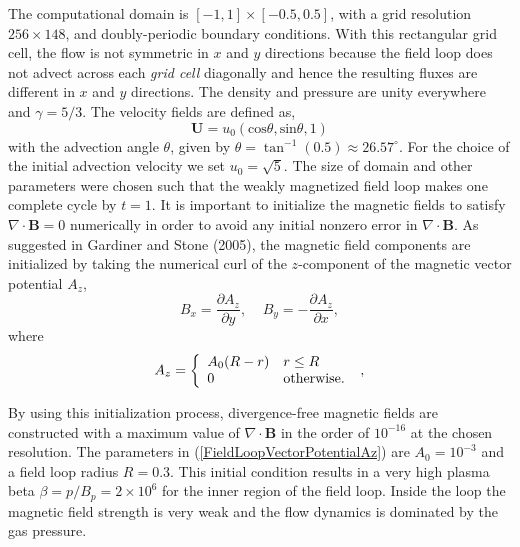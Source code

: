 The computational domain is $[-1,1]\times[-0.5,0.5]$, with a grid resolution $256\times148$, and doubly-periodic boundary conditions. 
With this rectangular grid cell, the flow is not symmetric in $x$ and $y$ directions because the field loop does not advect across each {\em grid cell} diagonally and hence the resulting fluxes are different in $x$ and $y$ directions. 
The density and pressure are unity everywhere and $\gamma=5/3$. The velocity fields are defined as,
\begin{equation}
\label{FieldLoopInitialVelocity}
\mathbf U=u_0(\mbox{cos}\theta,\mbox{sin}\theta,1)
\end{equation}
with the advection angle $\theta$, given by $\theta=\tan^{-1}(0.5)\approx 26.57^{\circ}$. For the choice of the initial advection velocity we set $u_0=\sqrt 5$. The size of domain and other parameters were chosen such that the weakly magnetized field loop makes one complete cycle by $t=1$. It is important to initialize the magnetic fields to satisfy $\nabla \cdot\mathbf B=0$ numerically in order to avoid any initial nonzero error in $\nabla \cdot\mathbf B$. As suggested in Gardiner and Stone (2005), the magnetic field components are initialized by taking the numerical curl of the $z$-component of the magnetic vector potential $A_z$,
\begin{equation}
B_x=\frac{\partial A_z}{\partial y}, \;\;\;\; B_y=-\frac{\partial A_z}{\partial x},
\end{equation}
where
\begin{eqnarray}
A_z=\left\{ \begin{array}{l@{\quad}l}
              A_0(R-r) & r \leq R \\
              0        & \mbox{otherwise.}
              \end{array} \right.\ ,
\label{FieldLoopVectorPotentialAz}
\end{eqnarray}

By using this initialization process, divergence-free magnetic fields are constructed with a maximum value of $\nabla \cdot\mathbf B$ in the order of $10^{-16}$ at the chosen resolution. The parameters in (\ref{FieldLoopVectorPotentialAz}) are $A_0=10^{-3}$ and a field loop radius $R=0.3$. This initial condition results in a very high plasma beta $\beta=p/B_p=2\times10^{6}$ for the inner region of the field loop. Inside the loop the magnetic field strength is very weak and the flow dynamics is dominated by the gas pressure. 


